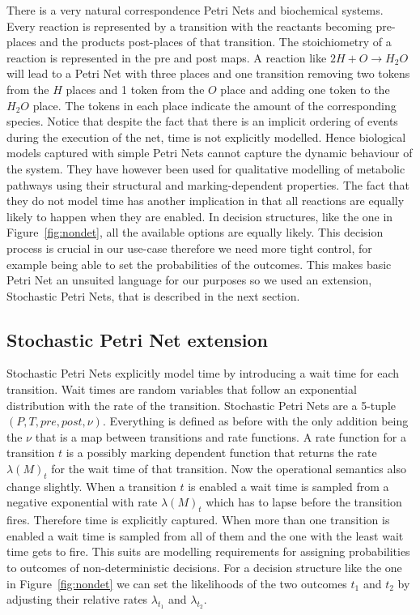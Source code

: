 There is a very natural correspondence Petri Nets and biochemical
systems. Every reaction is represented by a transition with the
reactants becoming pre-places and the products post-places of that
transition. The stoichiometry of a reaction is represented in the
pre and post maps. A reaction like $2H + O \rightarrow H_2O$ will lead
to a Petri Net with three places and one transition removing two
tokens from the $H$ places and 1 token from the $O$ place and adding
one token to the $H_2O$ place. The tokens in each place indicate the
amount of the corresponding species. Notice that despite the
fact that there is an implicit ordering of events during the execution
of the net, time is not explicitly modelled. Hence biological models
captured with simple Petri Nets cannot capture the dynamic behaviour
of the system. They have however been used for qualitative modelling
of metabolic pathways using their structural and
marking-dependent properties. The fact that they do not model time has
another implication in that all reactions are equally likely to
happen when they are enabled. In decision structures, like the one in
Figure~\ref{fig:nondet}, all the available options are equally
likely. This decision process is crucial in our use-case therefore we
need more tight control, for example being able to set the
probabilities of the outcomes. This makes basic Petri Net an unsuited
language for our purposes so we used an extension, Stochastic Petri
Nets, that is described in the next section.

\subsection{Stochastic Petri Net extension}
Stochastic Petri Nets explicitly model time by introducing a wait time
for each transition. Wait times are random variables that follow an
exponential distribution with the rate of the transition. Stochastic
Petri Nets are a 5-tuple $(P, T, pre, post, \nu)$. Everything is
defined as before with the only addition being the $\nu$ that is a
map between transitions and rate functions. A rate function for a
transition $t$ is a
possibly marking dependent function that returns the rate
$\lambda(M)_t$ for the wait time of that transition. Now the
operational semantics also change slightly. When a transition $t$ is
enabled a wait time is sampled from a negative exponential with rate
$\lambda(M)_t$ which has to lapse before the transition
fires. Therefore time is explicitly captured. When more than one
transition is enabled a wait time is sampled from all of them and the
one with the least wait time gets to fire. This suits are modelling
requirements for assigning probabilities to outcomes of
non-deterministic decisions. For a decision structure like the one in
Figure~\ref{fig:nondet} we can set the likelihoods of the two outcomes
$t_1$ and $t_2$ by adjusting their relative rates $\lambda_{t_1}$ and
$\lambda_{t_2}$. 

